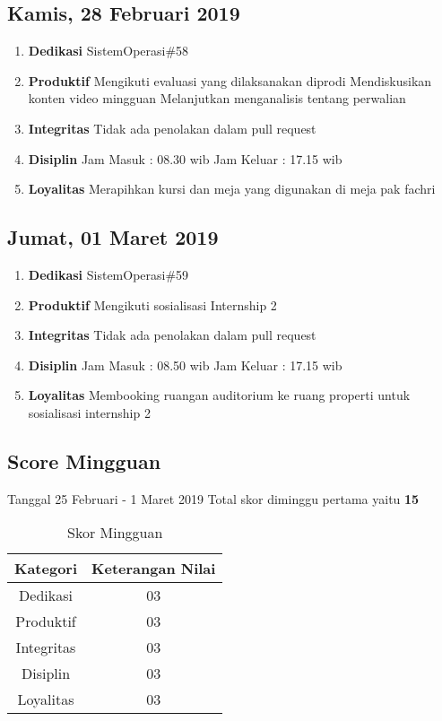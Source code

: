 \subsection{Kamis, 28 Februari 2019}
\begin{enumerate}
\item \textbf{Dedikasi}
\subitem SistemOperasi\#58
\item \textbf{Produktif}
\subitem Mengikuti evaluasi yang dilaksanakan diprodi
\subitem Mendiskusikan konten video mingguan
\subitem Melanjutkan menganalisis tentang perwalian 
\item \textbf{Integritas}
\subitem Tidak ada penolakan dalam pull request
\item \textbf{Disiplin}
\subitem Jam Masuk : 08.30 wib
\subitem Jam Keluar : 17.15 wib
\item \textbf{Loyalitas}
\subitem Merapihkan kursi dan meja yang digunakan di meja pak fachri 
\end{enumerate}

\subsection{Jumat, 01 Maret 2019}
\begin{enumerate}
\item \textbf{Dedikasi}
\subitem SistemOperasi\#59
\item \textbf{Produktif}
\subitem Mengikuti sosialisasi Internship 2
\item \textbf{Integritas}
\subitem Tidak ada penolakan dalam pull request
\item \textbf{Disiplin}
\subitem Jam Masuk : 08.50 wib
\subitem Jam Keluar : 17.15 wib
\item \textbf{Loyalitas}
\subitem Membooking ruangan auditorium ke ruang properti untuk sosialisasi internship 2
\end{enumerate}

\subsection{Score Mingguan} 
Tanggal 25 Februari - 1 Maret 2019 Total skor diminggu pertama yaitu \textbf{15}

\begin{table}[h]
\caption{Skor Mingguan}
\centering
\begin{tabular}{|c|c|}
\hline
\textbf{Kategori}&\textbf{Keterangan Nilai}\\
\hline
Dedikasi&03\\
\hline
Produktif&03\\
\hline
Integritas&03\\
\hline
Disiplin&03\\
\hline
Loyalitas&03\\
\hline
\end{tabular}
\label{table : skor mingguan hary}
\end{table}

